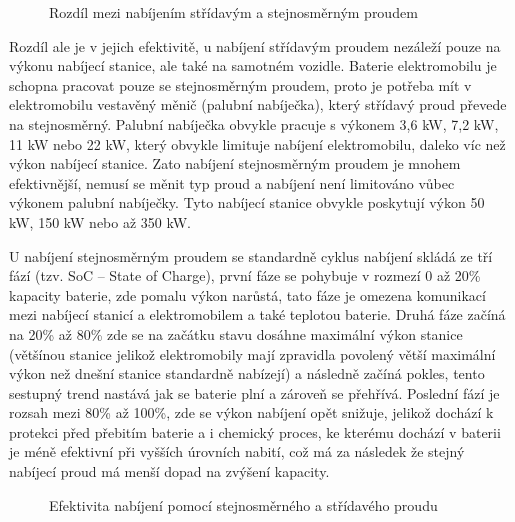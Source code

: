 \documentclass[a4paper,11pt]{article}
\begin{document}
\begin{figure}[H]
    \centering
    \caption{Rozdíl mezi nabíjením střídavým a stejnosměrným proudem \cite{rozdil_mezi_ac_dc_nabijenim}}
    \label{figure:difference-between-ac-and-cd-charging-ev}
\end{figure}

Rozdíl ale je v jejich efektivitě, u nabíjení střídavým proudem nezáleží pouze na výkonu nabíjecí stanice, 
ale také na samotném vozidle. Baterie elektromobilu je schopna pracovat pouze se stejnosměrným proudem, 
proto je potřeba mít v elektromobilu vestavěný měnič (palubní nabíječka), který střídavý proud převede 
na stejnosměrný. Palubní nabíječka obvykle pracuje s výkonem 3,6 kW, 7,2 kW, 11 kW nebo 22 kW,
který obvykle limituje nabíjení elektromobilu, daleko víc než výkon nabíjecí stanice. \cite{nabijeni_ev}
Zato nabíjení stejnosměrným proudem je mnohem efektivnější, nemusí se měnit typ proud a nabíjení není limitováno
vůbec výkonem palubní nabíječky. Tyto nabíjecí stanice obvykle poskytují výkon 50 kW, 150 kW nebo až 350 kW.\cite{nabijeni_ev, data_brno}

U nabíjení stejnosměrným proudem se standardně cyklus nabíjení skládá ze tří fází (tzv. SoC -- State of Charge), první
fáze se pohybuje v rozmezí 0 až 20\% kapacity baterie, zde pomalu výkon narůstá, tato fáze je omezena komunikací
mezi nabíjecí stanicí a elektromobilem a také teplotou baterie. Druhá fáze začíná na 20\% až 80\% zde se na začátku
stavu dosáhne maximální výkon stanice (většínou stanice jelikož elektromobily mají zpravidla povolený větší maximální výkon
než dnešní stanice standardně nabízejí) a následně začíná pokles, tento sestupný trend nastává jak se baterie plní a
zároveň se přehřívá. Poslední fází je rozsah mezi 80\% až 100\%, zde se výkon nabíjení opět snižuje, jelikož
dochází k protekci před přebitím baterie a i chemický proces, ke kterému dochází v baterii je méně efektivní 
při vyšších úrovních nabití, což má za následek že stejný nabíjecí proud má menší dopad na zvýšení kapacity.\cite{nabijeci_krivka}

\begin{figure}[H]
    \centering
    \caption{Efektivita nabíjení pomocí stejnosměrného a střídavého proudu \cite{rozdil_mezi_ac_dc_nabijenim_graf}}
    \label{figure:ac-dc-charging-efficency}
\end{figure}
\end{document}
